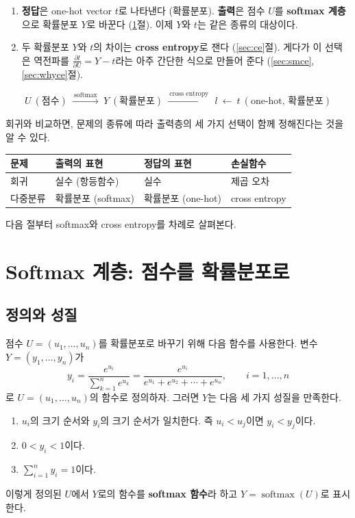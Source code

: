 \documentclass[11pt,a4paper]{article}
\newcommand{\pd}[2]{\frac{\partial #1}{\partial #2}}
\newcommand{\softmax}{\operatorname{softmax}}
\begin{document}
\begin{keybox}
\begin{enumerate}[label=\textbf{A\arabic*.},leftmargin=2.6em]
\item \textbf{정답}은 one-hot vector $t$로 나타낸다 (확률분포).
\textbf{출력}은 점수 $U$를 \textbf{softmax 계층}으로 확률분포 $Y$로 바꾼다
(\ref{sec:softmax}절). 이제 $Y$와 $t$는 같은 종류의 대상이다.
\item 두 확률분포 $Y$와 $t$의 차이는 \textbf{cross entropy}로 잰다 (\ref{sec:ce}절).
게다가 이 선택은 역전파를 $\pd{l}{U}=Y-t$라는 아주 간단한 식으로 만들어 준다
(\ref{sec:smce}, \ref{sec:whyce}절).
\end{enumerate}
\[
U\ (\text{점수})\ \xrightarrow{\ \text{softmax}\ }\ Y\ (\text{확률분포})\ \xrightarrow{\ \text{cross entropy}\ }\ l
\ \longleftarrow\ t\ (\text{one-hot, 확률분포})
\]
\end{keybox}

회귀와 비교하면, 문제의 종류에 따라 출력층의 세 가지 선택이 함께 정해진다는 것을 알 수 있다.

\begin{center}
\begin{tabular}{@{}llll@{}}
\toprule
문제 & 출력의 표현 & 정답의 표현 & 손실함수 \\
\midrule
회귀 & 실수 (항등함수) & 실수 & 제곱 오차 \\
다중분류 & 확률분포 (softmax) & 확률분포 (one-hot) & cross entropy \\
\bottomrule
\end{tabular}
\end{center}

다음 절부터 softmax와 cross entropy를 차례로 살펴본다.

\section{Softmax 계층: 점수를 확률분포로}\label{sec:softmax}

\subsection{정의와 성질}

점수 $U=(u_1,\ldots,u_n)$를 확률분포로 바꾸기 위해 다음 함수를 사용한다.
변수 $Y=(y_1,\ldots,y_n)$가
\[
\boxed{
y_i=\frac{e^{u_i}}{\sum_{k=1}^{n}e^{u_k}}=\frac{e^{u_i}}{e^{u_1}+e^{u_2}+\cdots+e^{u_n}},
\qquad i=1,\ldots,n
}
\]
로 $U=(u_1,\ldots,u_n)$의 함수로 정의하자. 그러면 $Y$는 다음 세 가지 성질을 만족한다.
\begin{enumerate}[label=\arabic*)]
\item $u_i$의 크기 순서와 $y_i$의 크기 순서가 일치한다. 즉 $u_i<u_j$이면 $y_i<y_j$이다.
\item $0<y_i<1$이다.
\item $\displaystyle\sum_{i=1}^{n}y_i=1$이다.
\end{enumerate}
이렇게 정의된 $U$에서 $Y$로의 함수를 \textbf{softmax 함수}라 하고 $Y=\softmax(U)$로 표시한다.
\end{document}
